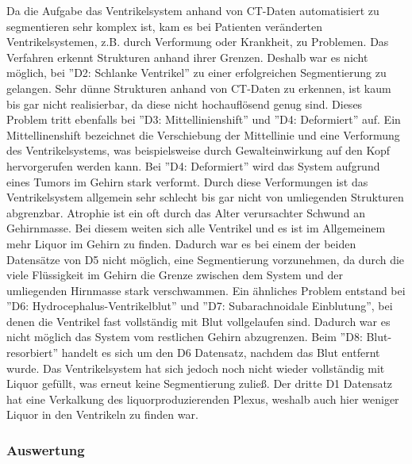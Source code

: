 Da die Aufgabe das Ventrikelsystem anhand von CT-Daten automatisiert zu segmentieren sehr komplex ist, kam es bei Patienten veränderten Ventrikelsystemen, z.B.  durch Verformung oder Krankheit, zu Problemen.
Das Verfahren erkennt Strukturen anhand ihrer Grenzen. Deshalb war es nicht möglich, bei ''D2: Schlanke Ventrikel'' zu einer erfolgreichen Segmentierung zu gelangen. Sehr dünne Strukturen anhand von CT-Daten zu erkennen, ist kaum bis gar nicht realisierbar, da diese nicht hochauflösend genug sind. Dieses Problem tritt ebenfalls bei ''D3: Mittellinienshift'' und  ''D4: Deformiert'' auf. Ein Mittellinenshift bezeichnet die Verschiebung der Mittellinie und eine Verformung des Ventrikelsystems, was beispielsweise durch Gewalteinwirkung auf den Kopf hervorgerufen werden kann. Bei ''D4: Deformiert'' wird das System aufgrund eines Tumors im Gehirn stark verformt. Durch diese Verformungen ist das Ventrikelsystem allgemein sehr schlecht bis gar nicht von umliegenden Strukturen abgrenzbar.
\newline
Atrophie ist ein oft durch das Alter verursachter Schwund an Gehirnmasse. Bei diesem weiten sich alle Ventrikel und es ist im Allgemeinem mehr Liquor im Gehirn zu finden. Dadurch war es bei einem der beiden Datensätze von D5 nicht möglich, eine Segmentierung vorzunehmen, da durch die viele Flüssigkeit im Gehirn die Grenze zwischen dem System und der umliegenden Hirnmasse stark verschwammen.
Ein ähnliches Problem entstand bei ''D6: Hydrocephalus-Ventrikelblut'' und ''D7: Subarachnoidale Einblutung'', bei denen die Ventrikel fast vollständig mit Blut vollgelaufen sind. Dadurch war es nicht möglich das System vom restlichen Gehirn abzugrenzen.
Beim ''D8: Blut-resorbiert'' handelt es sich um den D6 Datensatz, nachdem das Blut entfernt wurde. Das Ventrikelsystem hat sich jedoch noch nicht wieder vollständig mit Liquor gefüllt, was erneut keine Segmentierung zuließ.
Der dritte D1 Datensatz hat eine Verkalkung des liquorproduzierenden Plexus, weshalb auch hier weniger Liquor in den Ventrikeln zu finden war.



\subsubsection{Auswertung}

